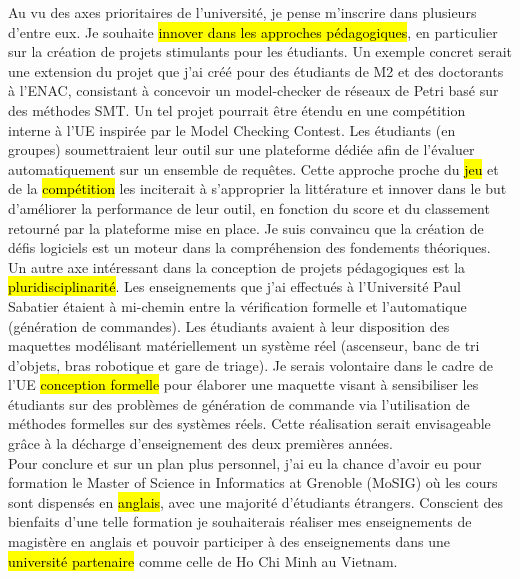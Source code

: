 Au vu des axes prioritaires de l'université, je pense m'inscrire dans plusieurs
d'entre eux. Je souhaite \hl{innover dans les approches pédagogiques}, en
particulier sur la création de projets stimulants pour les étudiants. Un exemple
concret serait une extension du projet que j'ai créé pour des étudiants de M2 et
des doctorants à l'ENAC, consistant à concevoir un model-checker de réseaux de
Petri basé sur des méthodes SMT. Un tel projet pourrait être étendu en une
compétition interne à l'UE inspirée par le Model Checking Contest. Les étudiants
(en groupes) soumettraient leur outil sur une plateforme dédiée afin de
l'évaluer automatiquement sur un ensemble de requêtes. Cette approche proche du
\hl{jeu} et de la \hl{compétition} les inciterait à s'approprier la littérature et
innover dans le but d'améliorer la performance de leur outil, en fonction du
score et du classement retourné par la plateforme mise en place. Je suis
convaincu que la création de défis logiciels est un moteur dans la
compréhension des fondements théoriques.\\


Un autre axe intéressant dans la conception de projets pédagogiques est la
\hl{pluridisciplinarité}. Les enseignements que
j'ai effectués à l'Université Paul Sabatier étaient à mi-chemin entre la
vérification formelle et l'automatique (génération de commandes). Les étudiants
avaient à leur disposition des maquettes modélisant matériellement un système
réel (ascenseur, banc de tri d'objets, bras robotique et gare de triage). Je serais volontaire dans
le cadre de l'UE \og \hl{conception formelle} \fg pour élaborer une maquette
visant à sensibiliser les étudiants sur des problèmes de génération de commande
via l'utilisation de méthodes formelles sur des systèmes réels. Cette
réalisation serait envisageable grâce à la décharge d'enseignement des deux
premières années.\\

Pour conclure et sur un plan plus personnel, j'ai eu la chance d'avoir eu pour
formation le Master of Science in Informatics at Grenoble (MoSIG) où les cours
sont dispensés en \hl{anglais}, avec une majorité d'étudiants étrangers.
Conscient des bienfaits d'une telle formation je souhaiterais réaliser mes
enseignements de magistère en anglais et pouvoir participer à des enseignements
dans une \hl{université partenaire} comme celle de Ho Chi Minh au Vietnam.
